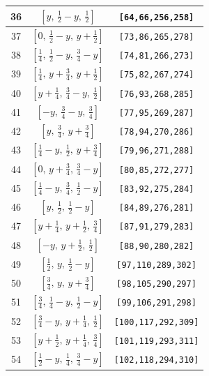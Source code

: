 \documentclass[fleqn,8pt]{jsarticle}
\begin{document}
\begin{longtable}{ccc}
36 & $\left[ y,\, \frac{1}{2} - y,\, \frac{1}{2} \right]$ & {\tt [64,66,256,258]} \\ \hline
37 & $\left[ 0,\, \frac{1}{2} - y,\, y + \frac{1}{2} \right]$ & {\tt [73,86,265,278]} \\ \hline
38 & $\left[ \frac{1}{4},\, \frac{1}{2} - y,\, \frac{3}{4} - y \right]$ & {\tt [74,81,266,273]} \\ \hline
39 & $\left[ \frac{1}{4},\, y + \frac{3}{4},\, y + \frac{1}{2} \right]$ & {\tt [75,82,267,274]} \\ \hline
40 & $\left[ y + \frac{1}{4},\, \frac{3}{4} - y,\, \frac{1}{2} \right]$ & {\tt [76,93,268,285]} \\ \hline
41 & $\left[ - y,\, \frac{3}{4} - y,\, \frac{3}{4} \right]$ & {\tt [77,95,269,287]} \\ \hline
42 & $\left[ y,\, \frac{3}{4},\, y + \frac{3}{4} \right]$ & {\tt [78,94,270,286]} \\ \hline
43 & $\left[ \frac{1}{4} - y,\, \frac{1}{2},\, y + \frac{3}{4} \right]$ & {\tt [79,96,271,288]} \\ \hline
44 & $\left[ 0,\, y + \frac{3}{4},\, \frac{3}{4} - y \right]$ & {\tt [80,85,272,277]} \\ \hline
45 & $\left[ \frac{1}{4} - y,\, \frac{3}{4},\, \frac{1}{2} - y \right]$ & {\tt [83,92,275,284]} \\ \hline
46 & $\left[ y,\, \frac{1}{2},\, \frac{1}{2} - y \right]$ & {\tt [84,89,276,281]} \\ \hline
47 & $\left[ y + \frac{1}{4},\, y + \frac{1}{2},\, \frac{3}{4} \right]$ & {\tt [87,91,279,283]} \\ \hline
48 & $\left[ - y,\, y + \frac{1}{2},\, \frac{1}{2} \right]$ & {\tt [88,90,280,282]} \\ \hline
49 & $\left[ \frac{1}{2},\, y,\, \frac{1}{2} - y \right]$ & {\tt [97,110,289,302]} \\ \hline
50 & $\left[ \frac{3}{4},\, y,\, y + \frac{3}{4} \right]$ & {\tt [98,105,290,297]} \\ \hline
51 & $\left[ \frac{3}{4},\, \frac{1}{4} - y,\, \frac{1}{2} - y \right]$ & {\tt [99,106,291,298]} \\ \hline
52 & $\left[ \frac{3}{4} - y,\, y + \frac{1}{4},\, \frac{1}{2} \right]$ & {\tt [100,117,292,309]} \\ \hline
53 & $\left[ y + \frac{1}{2},\, y + \frac{1}{4},\, \frac{3}{4} \right]$ & {\tt [101,119,293,311]} \\ \hline
54 & $\left[ \frac{1}{2} - y,\, \frac{1}{4},\, \frac{3}{4} - y \right]$ & {\tt [102,118,294,310]} \\ \hline

\end{longtable}
\end{document}
